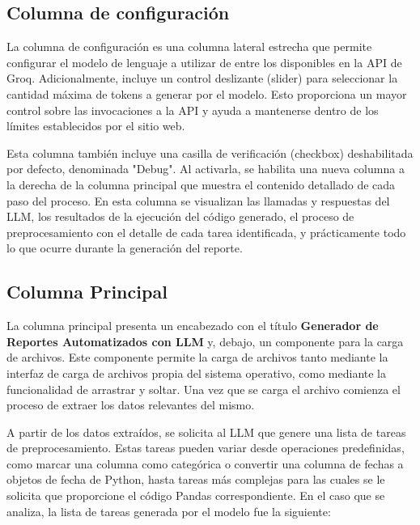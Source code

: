 \subsection{Columna de configuración}
La columna de configuración es una columna lateral estrecha que permite configurar el modelo de lenguaje a utilizar de entre los disponibles en la API de Groq.  Adicionalmente, incluye un control deslizante (slider) para seleccionar la cantidad máxima de tokens a generar por el modelo. Esto proporciona un mayor control sobre las invocaciones a la API y ayuda a mantenerse dentro de los límites establecidos por el sitio web.

Esta columna también incluye una casilla de verificación (checkbox) deshabilitada por defecto, denominada "Debug". Al activarla, se habilita una nueva columna a la derecha de la columna principal que muestra el contenido detallado de cada paso del proceso. En esta columna se visualizan las llamadas y respuestas del LLM, los resultados de la ejecución del código generado, el proceso de preprocesamiento con el detalle de cada tarea identificada, y prácticamente todo lo que ocurre durante la generación del reporte.

\subsection{Columna Principal}
La columna principal presenta un encabezado con el título \textbf{Generador de Reportes Automatizados con LLM} y, debajo, un componente para la carga de archivos.  Este componente permite la carga de archivos tanto mediante la interfaz de carga de archivos propia del sistema operativo, como mediante la funcionalidad de arrastrar y soltar. Una vez que se carga el archivo comienza el proceso de extraer los datos relevantes del mismo.

A partir de los datos extraídos, se solicita al LLM que genere una lista de tareas de preprocesamiento.  Estas tareas pueden variar desde operaciones predefinidas, como marcar una columna como categórica o convertir una columna de fechas a objetos de fecha de Python, hasta tareas más complejas para las cuales se le solicita que proporcione el código Pandas correspondiente. En el caso que se analiza, la lista de tareas generada por el modelo fue la siguiente:



